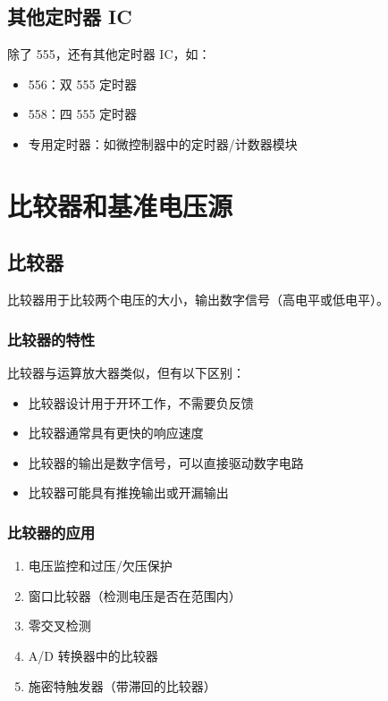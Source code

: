 \subsection{其他定时器 IC}

除了 555，还有其他定时器 IC，如：
\begin{itemize}
  \item 556：双 555 定时器
  \item 558：四 555 定时器
  \item 专用定时器：如微控制器中的定时器/计数器模块
\end{itemize}

\section{比较器和基准电压源}

\subsection{比较器}

比较器用于比较两个电压的大小，输出数字信号（高电平或低电平）。

\subsubsection{比较器的特性}

比较器与运算放大器类似，但有以下区别：
\begin{itemize}
  \item 比较器设计用于开环工作，不需要负反馈
  \item 比较器通常具有更快的响应速度
  \item 比较器的输出是数字信号，可以直接驱动数字电路
  \item 比较器可能具有推挽输出或开漏输出
\end{itemize}

\subsubsection{比较器的应用}

\begin{enumerate}
  \item 电压监控和过压/欠压保护
  \item 窗口比较器（检测电压是否在范围内）
  \item 零交叉检测
  \item A/D 转换器中的比较器
  \item 施密特触发器（带滞回的比较器）
\end{enumerate}

